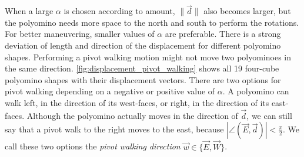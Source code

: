 When a large $\alpha$ is chosen according to amount, $\lVert \vec{d} \rVert$ also becomes larger, but the polyomino needs more space to the north and south to perform the rotations.
For better maneuvering, smaller values of $\alpha$ are preferable.
There is a strong deviation of length and direction of the displacement for different polyomino shapes.
Performing a pivot walking motion might not move two polyominoes in the same direction.
\autoref{fig:displacement_pivot_walking} shows all 19 four-cube polyomino shapes with their displacement vectors.
There are two options for pivot walking depending on a negative or positive value of $\alpha$.
A polyomino can walk left, in the direction of its west-faces, or right, in the direction of its east-faces.
Although the polyomino actually moves in the direction of $\vec{d}$, we can still say that a pivot walk to the right moves to the east, because $\left| \angle \left( \vec{E}, \vec{d} \right) \right| < \frac{\pi}{2}$.
We call these two options the \textit{pivot walking direction} $\vec{w} \in \{\vec{E}, \vec{W}\}$.
